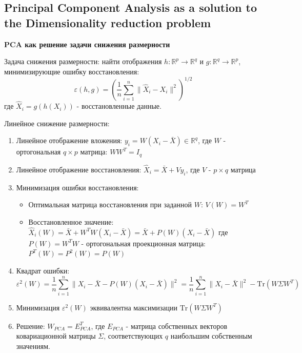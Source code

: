 \documentclass[a4paper,12pt]{article}
\begin{document}
\subsection{Principal Component Analysis as a solution to the Dimensionality reduction problem}

\textbf{PCA как решение задачи снижения размерности}

Задача снижения размерности: найти отображения $h: \mathbb{R}^p \rightarrow \mathbb{R}^q$ и $g: \mathbb{R}^q \rightarrow \mathbb{R}^p$, минимизирующие ошибку восстановления:
$$\varepsilon(h, g) = \left(\frac{1}{n} \sum_{i=1}^n \|\hat{X}_i - X_i\|^2\right)^{1/2}$$
где $\hat{X}_i = g(h(X_i))$ - восстановленные данные.

Линейное снижение размерности:
\begin{enumerate}
    \item Линейное отображение вложения: $y_i = W(X_i - \bar{X}) \in \mathbb{R}^q$, где $W$ - ортогональная $q \times p$ матрица: $WW^T = I_q$
    
    \item Линейное отображение восстановления: $\hat{X}_i = \bar{X} + Vy_i$, где $V$ - $p \times q$ матрица

    \item Минимизация ошибки восстановления:
    \begin{itemize}
        \item Оптимальная матрица восстановления при заданной $W$: $V(W) = W^T$
        \item Восстановленное значение: $\hat{X}_i(W) = \bar{X} + W^T W (X_i - \bar{X}) = \bar{X} + P(W)(X_i - \bar{X})$
        где $P(W) = W^T W$ - ортогональная проекционная матрица: $P^T(W) = P^2(W) = P(W)$
    \end{itemize}

    \item Квадрат ошибки:
    $$\varepsilon^2(W) = \frac{1}{n}\sum_{i=1}^n \|X_i - \bar{X} - P(W)(X_i - \bar{X})\|^2 = \frac{1}{n}\sum_{i=1}^n \|X_i - \bar{X}\|^2 - \text{Tr}(W\Sigma W^T)$$

    \item Минимизация $\varepsilon^2(W)$ эквивалентна максимизации $\text{Tr}(W\Sigma W^T)$

    \item Решение: $W_{PCA} = E_{PCA}^T$, где $E_{PCA}$ - матрица собственных векторов ковариационной матрицы $\Sigma$, соответствующих $q$ наибольшим собственным значениям.
\end{enumerate}
\end{document}
